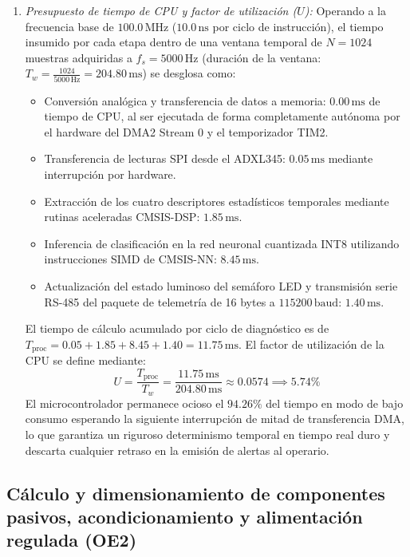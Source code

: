 \begin{enumerate}
    \item \textit{Presupuesto de tiempo de CPU y factor de utilización ($U$):} Operando a la frecuencia base de $100.0\,\text{MHz}$ ($10.0\,\text{ns}$ por ciclo de instrucción), el tiempo insumido por cada etapa dentro de una ventana temporal de $N = 1024$ muestras adquiridas a $f_s = 5000\,\text{Hz}$ (duración de la ventana: $T_w = \frac{1024}{5000\,\text{Hz}} = 204.80\,\text{ms}$) se desglosa como:
    \begin{itemize}
        \item Conversión analógica y transferencia de datos a memoria: $0.00\,\text{ms}$ de tiempo de CPU, al ser ejecutada de forma completamente autónoma por el hardware del DMA2 Stream 0 y el temporizador TIM2.
        \item Transferencia de lecturas SPI desde el ADXL345: $0.05\,\text{ms}$ mediante interrupción por hardware.
        \item Extracción de los cuatro descriptores estadísticos temporales mediante rutinas aceleradas CMSIS-DSP: $1.85\,\text{ms}$.
        \item Inferencia de clasificación en la red neuronal cuantizada INT8 utilizando instrucciones SIMD de CMSIS-NN: $8.45\,\text{ms}$.
        \item Actualización del estado luminoso del semáforo LED y transmisión serie RS-485 del paquete de telemetría de 16 bytes a $115200\,\text{baud}$: $1.40\,\text{ms}$.
    \end{itemize}
    El tiempo de cálculo acumulado por ciclo de diagnóstico es de $T_{\text{proc}} = 0.05 + 1.85 + 8.45 + 1.40 = 11.75\,\text{ms}$. El factor de utilización de la CPU se define mediante:
    \begin{equation}
    U = \frac{T_{\text{proc}}}{T_w} = \frac{11.75\,\text{ms}}{204.80\,\text{ms}} \approx 0.0574 \implies 5.74\%
    \label{eq:mp_utilizacion_cpu}
    \end{equation}
    El microcontrolador permanece ocioso el $94.26\%$ del tiempo en modo de bajo consumo esperando la siguiente interrupción de mitad de transferencia DMA, lo que garantiza un riguroso determinismo temporal en tiempo real duro y descarta cualquier retraso en la emisión de alertas al operario.
\end{enumerate}

\subsection{Cálculo y dimensionamiento de componentes pasivos, acondicionamiento y alimentación regulada (OE2)}
\label{subsec:dimensionamiento_pasivos_alimentacion}

